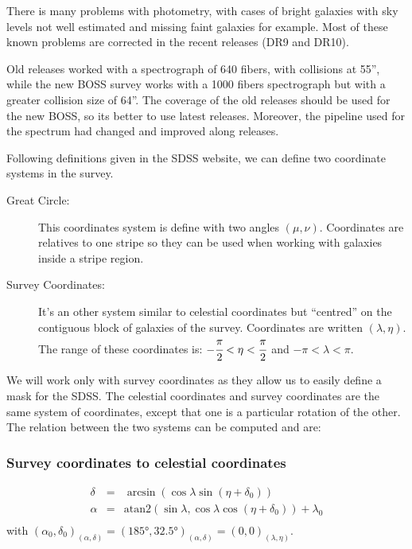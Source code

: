 There is many problems with photometry, with cases of bright galaxies with
sky levels not well estimated and missing faint galaxies for example. Most
of these known problems are corrected in the recent releases (DR9 and DR10).

Old releases worked with a spectrograph of 640 fibers, with collisions at
55'', while the new BOSS survey works with a 1000 fibers spectrograph but
with a greater collision size of 64''. The coverage of the old releases
should be used for the new BOSS, so its better to use latest releases.
Moreover, the pipeline used for the spectrum had changed and improved along
releases.

Following definitions given in the SDSS website, we can define two
coordinate systems in the survey.
%
\begin{description}
    \item[Great Circle:] This coordinates system is define with two angles
        $(\mu, \nu)$. Coordinates are relatives to one stripe so they can be
        used when working with galaxies inside a stripe region.

    \item[Survey Coordinates:] It's an other system similar to celestial
        coordinates but ``centred'' on the contiguous block of galaxies  of
        the survey. Coordinates are written $(\lambda, \eta)$. The range of
        these coordinates is: $-\cfrac{\pi}{2}<\eta<\cfrac{\pi}{2}$ and
        $-\pi<\lambda<\pi$.
\end{description}
%
We will work only with survey coordinates as they allow us to easily define
a mask for the SDSS\@. The celestial coordinates and survey coordinates are
the same system of coordinates, except that one is a particular rotation of
the other. The relation between the two systems can be computed and are:

\subsubsection{Survey coordinates to celestial coordinates}

\begin{eqnarray}
    \delta &=&
        \arcsin\left(\cos\lambda\sin\left(\eta+\delta_0\right)\right)
        \nonumber\\
    \alpha &=&
        \mathrm{atan2}
        \left(\sin\lambda,\cos\lambda\cos\left(\eta+\delta_0\right)\right)+
        \lambda_0\nonumber\\
\end{eqnarray}
%
with ${\left(\alpha_0,\delta_0\right)}_{\left(\alpha,\delta\right)}=
{\left(185°,32.5°\right)}_{\left(\alpha,\delta\right)}=
{\left(0,0\right)}_{\left(\lambda, \eta\right)}$.

